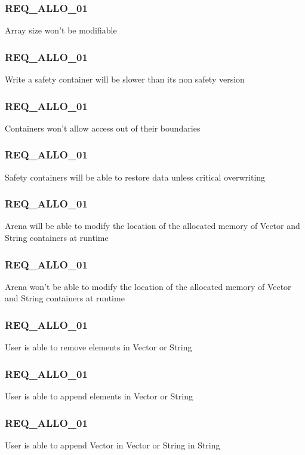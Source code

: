 \documentclass[a4paper,11pt]{article}
\begin{document}
\subsubsection{REQ\_ALLO\_01}
Array size won't be modifiable

\subsubsection{REQ\_ALLO\_01}
Write a safety container will be slower than its non safety version

\subsubsection{REQ\_ALLO\_01}
Containers won't allow access out of their boundaries

\subsubsection{REQ\_ALLO\_01}
Safety containers will be able to restore data unless critical overwriting

\subsubsection{REQ\_ALLO\_01}
Arena will be able to modify the location of the allocated memory of Vector and String containers at runtime

\subsubsection{REQ\_ALLO\_01}
Arena won't be able to modify the location of the allocated memory of Vector and String containers at runtime

\subsubsection{REQ\_ALLO\_01}
User is able to remove elements in Vector or String

\subsubsection{REQ\_ALLO\_01}
User is able to append elements in Vector or String

\subsubsection{REQ\_ALLO\_01}
User is able to append Vector in Vector or String in String
\end{document}
